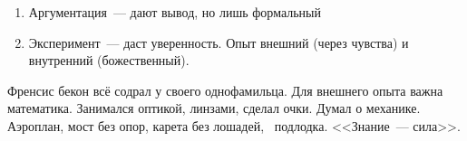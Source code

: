 \begin{enumerate}
	\item Аргументация~--- дают вывод, но лишь формальный
	\item Эксперимент~--- даст уверенность. Опыт внешний (через чувства) и внутренний (божественный). 
\end{enumerate}
Френсис бекон всё содрал у своего однофамильца.
Для внешнего опыта важна математика. Занимался оптикой, линзами, сделал очки. Думал о механике. Аэроплан, мост без опор, карета без лошадей, ~подлодка. <<Знание~--- сила>>.
